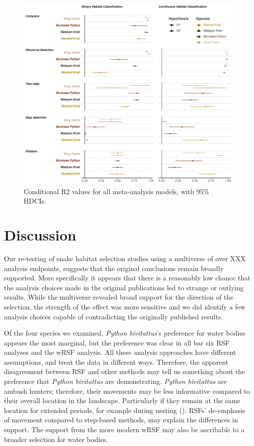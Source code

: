 \documentclass[10pt,a4paper]{article}
\begin{document}
\begin{figure}
\includegraphics[width=1\linewidth]{../../figures/r2Plot} \caption{Conditional R2 values for all meta-analysis models, with 95\% HDCIs.}\label{fig:metaR2Plot}
\end{figure}

\section{Discussion}\label{discussion}

Our re-testing of snake habitat selection studies using a multiverse of over XXX analysis endpoints, suggests that the original conclusions remain broadly supported.
More specifically it appears that there is a reasonably low chance that the analysis choices made in the original publications led to strange or outlying results.
While the multiverse revealed broad support for the direction of the selection, the strength of the effect was more sensitive and we did identify a few analysis choices capable of contradicting the originally published results.

Of the four species we examined, \emph{Python bivitattus}'s preference for water bodies appears the most marginal, but the preference was clear in all bar six RSF analyses and the wRSF analysis.
All these analysis approaches have different assumptions, and treat the data in different ways.
Therefore, the apparent disagreement between RSF and other methods may tell us something about the preference that \emph{Python bivitattus} are demonstrating.
\emph{Python bivitattus} are ambush hunters; therefore, their movements may be less informative compared to their overall location in the landscape.
Particularly if they remain at the same location for extended periods, for example during nesting ().
RSFs' de-emphasis of movement compared to step-based methods, may explain the differences in support.
The support from the more modern wRSF may also be ascribable to a broader selection for water bodies.
\end{document}
